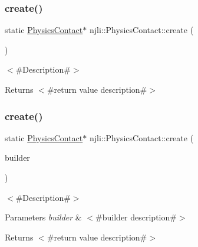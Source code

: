 \subsubsection{\texorpdfstring{create()}{create()}\hspace{0.1cm}{\footnotesize\ttfamily [2/3]}}
{\footnotesize\ttfamily static \mbox{\hyperlink{classnjli_1_1_physics_contact}{Physics\+Contact}}$\ast$ njli\+::\+Physics\+Contact\+::create (\begin{DoxyParamCaption}{ }\end{DoxyParamCaption})\hspace{0.3cm}{\ttfamily [static]}}

$<$\#\+Description\#$>$

\begin{DoxyReturn}{Returns}
$<$\#return value description\#$>$ 
\end{DoxyReturn}
\mbox{\label{classnjli_1_1_physics_contact_a774cecf47bf21a0a6af2807cf6161f93}} 
\subsubsection{\texorpdfstring{create()}{create()}\hspace{0.1cm}{\footnotesize\ttfamily [3/3]}}
{\footnotesize\ttfamily static \mbox{\hyperlink{classnjli_1_1_physics_contact}{Physics\+Contact}}$\ast$ njli\+::\+Physics\+Contact\+::create (\begin{DoxyParamCaption}\item[{const \mbox{\hyperlink{classnjli_1_1_physics_contact_builder}{Physics\+Contact\+Builder}} \&}]{builder }\end{DoxyParamCaption})\hspace{0.3cm}{\ttfamily [static]}}

$<$\#\+Description\#$>$


\begin{DoxyParams}{Parameters}
{\em builder} & $<$\#builder description\#$>$\\
\hline
\end{DoxyParams}
\begin{DoxyReturn}{Returns}
$<$\#return value description\#$>$ 
\end{DoxyReturn}
\mbox{\label{classnjli_1_1_physics_contact_a4e2f5f156a83e857dbbcdaeabd177190}} 
